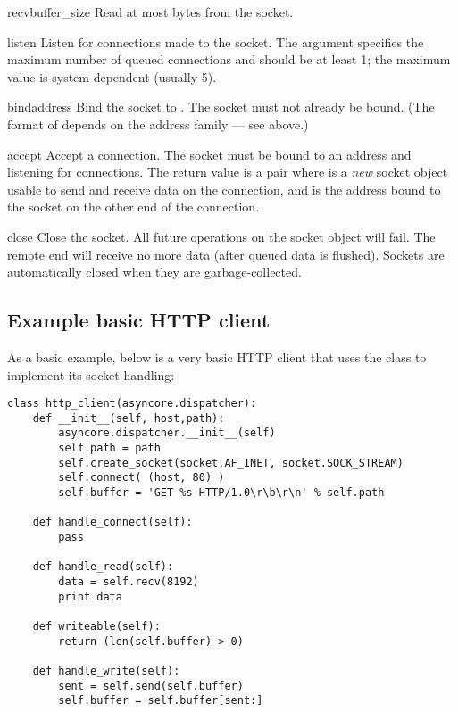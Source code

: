 \begin{methoddesc}{recv}{buffer_size}
  Read at most  bytes from the socket.
\end{methoddesc}

\begin{methoddesc}{listen}{}
  Listen for connections made to the socket.  The 
  argument specifies the maximum number of queued connections
  and should be at least 1; the maximum value is
  system-dependent (usually 5).
\end{methoddesc}

\begin{methoddesc}{bind}{address}
  Bind the socket to .  The socket must not already
  be bound.  (The format of  depends on the address
  family --- see above.)
\end{methoddesc}

\begin{methoddesc}{accept}{}
  Accept a connection.  The socket must be bound to an address
  and listening for connections.  The return value is a pair
   where  is a
  \emph{new} socket object usable to send and receive data on
  the connection, and  is the address bound to the
  socket on the other end of the connection.
\end{methoddesc}

\begin{methoddesc}{close}{}
  Close the socket.  All future operations on the socket object
  will fail.  The remote end will receive no more data (after
  queued data is flushed).  Sockets are automatically closed
  when they are garbage-collected.
\end{methoddesc}


\subsection{Example basic HTTP client \label{asyncore-example}}

As a basic example, below is a very basic HTTP client that uses the 
 class to implement its socket handling:

\begin{verbatim}
class http_client(asyncore.dispatcher):
    def __init__(self, host,path):
        asyncore.dispatcher.__init__(self)
        self.path = path
        self.create_socket(socket.AF_INET, socket.SOCK_STREAM)
        self.connect( (host, 80) )
        self.buffer = 'GET %s HTTP/1.0\r\b\r\n' % self.path
        
    def handle_connect(self):
        pass
        
    def handle_read(self):
        data = self.recv(8192)
        print data
        
    def writeable(self):
        return (len(self.buffer) > 0)
    
    def handle_write(self):
        sent = self.send(self.buffer)
        self.buffer = self.buffer[sent:]
\end{verbatim}
